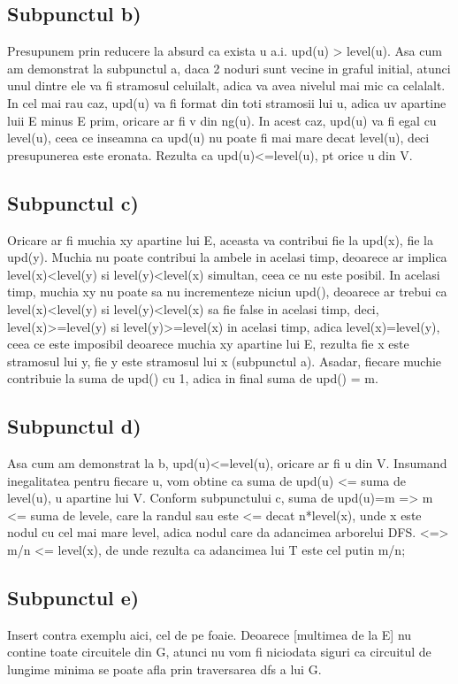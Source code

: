 \documentclass{article}
\begin{document}
\subsection*{\fontsize{16}{30}\selectfont Subpunctul b)}
{\fontsize{14}{16}\selectfont
Presupunem prin reducere la absurd ca exista u a.i. upd(u) > level(u). Asa cum am demonstrat la subpunctul a, daca 2 noduri sunt vecine in graful initial, atunci unul dintre ele va fi stramosul celuilalt, adica va avea nivelul mai mic ca celalalt. In cel mai rau caz, upd(u) va fi format din toti stramosii lui u, adica uv apartine luii E minus E prim, oricare ar fi v din ng(u). In acest caz, upd(u) va fi egal cu level(u), ceea ce inseamna ca upd(u) nu poate fi mai mare decat level(u), deci presupunerea este eronata. Rezulta ca upd(u)<=level(u), pt orice u din V. }
\subsection*{\fontsize{16}{30}\selectfont Subpunctul c)}
{\fontsize{14}{16}\selectfont
Oricare ar fi muchia xy apartine lui E, aceasta va contribui fie la upd(x), fie la upd(y). Muchia nu poate contribui la ambele in acelasi timp, deoarece ar implica level(x)<level(y) si level(y)<level(x) simultan, ceea ce nu este posibil. In acelasi timp, muchia xy nu poate sa nu incrementeze niciun upd(), deoarece ar trebui ca level(x)<level(y) si level(y)<level(x) sa fie false in acelasi timp, deci, level(x)>=level(y) si level(y)>=level(x) in acelasi timp, adica level(x)=level(y), ceea ce este imposibil deoarece muchia xy apartine lui E, rezulta fie x este stramosul lui y, fie y este stramosul lui x (subpunctul a). Asadar, fiecare muchie contribuie la suma de upd() cu 1, adica in final suma de upd() = m.
}
\subsection*{\fontsize{16}{30}\selectfont Subpunctul d)}
{\fontsize{14}{16}\selectfont
Asa cum am demonstrat la b, upd(u)<=level(u), oricare ar fi u din V. Insumand inegalitatea pentru fiecare u, vom obtine ca suma de upd(u) <= suma de level(u), u apartine lui V. Conform subpunctului c, suma de upd(u)=m => m <= suma de levele, care la randul sau este <= decat n*level(x), unde x este nodul cu cel mai mare level, adica nodul care da adancimea arborelui DFS. <=> m/n <= level(x), de unde rezulta ca adancimea lui T este cel putin m/n; 
}
\subsection*{\fontsize{16}{30}\selectfont Subpunctul e)}
Insert contra exemplu aici, cel de pe foaie. 
Deoarece [multimea de la E] nu contine toate circuitele din G, atunci nu vom fi niciodata siguri ca circuitul de lungime minima se poate afla prin traversarea dfs a lui G.  
\end{document}
